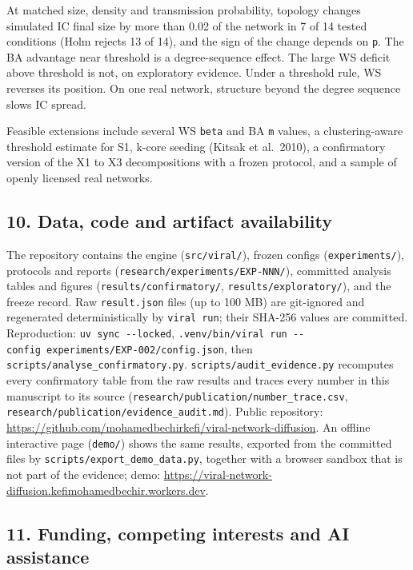 \documentclass[
]{article}
\begin{document}
At matched size, density and transmission probability, topology changes
simulated IC final size by more than 0.02 of the network in 7 of 14
tested conditions (Holm rejects 13 of 14), and the sign of the change
depends on \texttt{p}. The BA advantage near threshold is a
degree-sequence effect. The large WS deficit above threshold is not, on
exploratory evidence. Under a threshold rule, WS reverses its position.
On one real network, structure beyond the degree sequence slows IC
spread.

Feasible extensions include several WS \texttt{beta} and BA \texttt{m}
values, a clustering-aware threshold estimate for S1, k-core seeding
(Kitsak et al.~2010), a confirmatory version of the X1 to X3
decompositions with a frozen protocol, and a sample of openly licensed
real networks.

\subsection{10. Data, code and artifact
availability}\label{data-code-and-artifact-availability}

The repository contains the engine (\texttt{src/viral/}), frozen configs
(\texttt{experiments/}), protocols and reports
(\texttt{research/experiments/EXP-NNN/}), committed analysis tables and
figures (\texttt{results/confirmatory/}, \texttt{results/exploratory/}),
and the freeze record. Raw \texttt{result.json} files (up to 100 MB) are
git-ignored and regenerated deterministically by \texttt{viral\ run};
their SHA-256 values are committed. Reproduction:
\texttt{uv\ sync\ -\/-locked},
\texttt{.venv/bin/viral\ run\ -\/-config\ experiments/EXP-002/config.json},
then \texttt{scripts/analyse\_confirmatory.py}.
\texttt{scripts/audit\_evidence.py} recomputes every confirmatory table
from the raw results and traces every number in this manuscript to its
source (\texttt{research/publication/number\_trace.csv},
\texttt{research/publication/evidence\_audit.md}). Public repository:
\url{https://github.com/mohamedbechirkefi/viral-network-diffusion}. An
offline interactive page (\texttt{demo/}) shows the same results,
exported from the committed files by
\texttt{scripts/export\_demo\_data.py}, together with a browser sandbox
that is not part of the evidence; demo:
\url{https://viral-network-diffusion.kefimohamedbechir.workers.dev}.

\subsection{11. Funding, competing interests and AI
assistance}\label{funding-competing-interests-and-ai-assistance}
\end{document}
